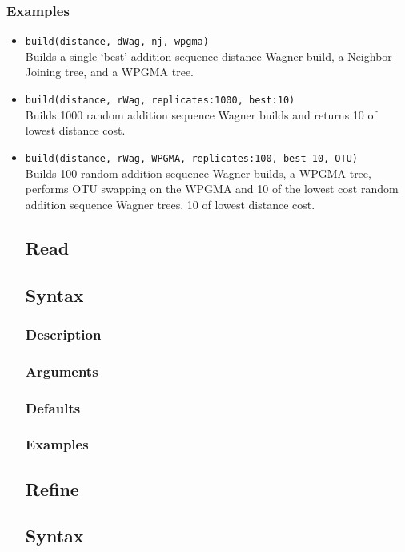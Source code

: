 \documentclass[11pt]{article}
\begin{document}
		\subsubsection{Examples}
		\begin{itemize}
			\item{\texttt{build(distance, dWag, nj, wpgma)}\\Builds a single `best' addition sequence distance Wagner build, a Neighbor-Joining tree, and a WPGMA tree.}
			\item{\texttt{build(distance, rWag, replicates:1000, best:10)}\\Builds 1000 random addition sequence  Wagner builds and returns  
			10 of lowest distance cost.}
			\item{\texttt{build(distance, rWag, WPGMA, replicates:100, best 10, OTU)} \\Builds 100 random addition sequence  Wagner builds, a WPGMA tree, performs OTU swapping on the WPGMA and 10 of the lowest cost random addition sequence Wagner trees. 
		10 of lowest distance cost.}
		
	\subsection{Read}
		\subsection{Syntax}
		\subsubsection{Description}
		\subsubsection{Arguments}
		\subsubsection{Defaults}
		\subsubsection{Examples}

	\subsection{Refine}
		\subsection{Syntax}

\end{itemize}
\end{document}
